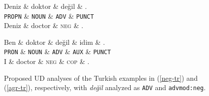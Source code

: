 \documentclass[10pt, a4paper]{article}
\newcommand{\gl}[1]{\textsc{#1}}
\newcommand{\upos}[1]{\texttt{#1}}
\newcommand{\rel}[1]{\texttt{#1}}
\begin{document}
\begin{figure}[ht]
  \centering
  \begin{dependency}
    \begin{deptext}[column sep=1.6em]
      Deniz \& doktor \& değil \& .\\
      \footnotesize \upos{PROPN} \& \footnotesize \upos{NOUN} \& \footnotesize \upos{ADV} \& \footnotesize \upos{PUNCT} \\
      \footnotesize Deniz \& \footnotesize doctor \& \gl{neg} \& . \\
    \end{deptext}
  \end{dependency}
  \vspace{1em}
  \begin{dependency}
    \begin{deptext}[column sep=1.6em]
      Ben \& doktor \& değil \& idim \& .\\
      \footnotesize \upos{PRON} \& \footnotesize \upos{NOUN} \& \footnotesize \upos{ADV} \& \footnotesize \upos{AUX} \& \footnotesize \upos{PUNCT} \\
      \footnotesize I \& \footnotesize doctor \& \gl{neg} \& \gl{cop} \& . \\
    \end{deptext}
  \end{dependency}
  \caption{Proposed UD analyses of the Turkish examples in (\ref{neg-tr}) and (\ref{agr-tr}), respectively, with \emph{de\u{g}il} analyzed as \upos{ADV} and \rel{advmod:neg}.}
  \label{fig:proposed-trees}
\end{figure}
\end{document}
